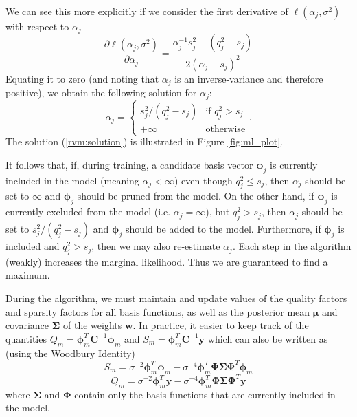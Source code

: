 We can see this more explicitly if we consider the first derivative of $\ell(\alpha_j,\sigma^2)$ with respect to $\alpha_j$ \cite{tipping2002}
\begin{equation*}
  \frac{\partial\ell(\alpha_j,\sigma^2)}{\partial\alpha_j} = \frac{\alpha_j^{-1}s_j^2 - (q_j^2 - s_j)}{2(\alpha_j+s_j)^2}
\end{equation*}
Equating it to zero (and noting that $\alpha_j$ is an inverse-variance and therefore positive), we obtain the following solution for $\alpha_j$:
\begin{equation}
  \label{rvm:solution}
  \alpha_j = \left\{\begin{array}{lr}
      s_j^2 / (q_j^2 - s_j) & \mbox{if $q_j^2 > s_j$}\\
      +\infty & \mbox{otherwise}
    \end{array}\right..
\end{equation}
The solution (\ref{rvm:solution}) is illustrated in Figure \ref{fig:ml_plot}.

It follows that, if, during training, a candidate basis vector $\bm\phi_j$ is currently included in the model (meaning $\alpha_j < \infty$) even though $q_j^2 \leq s_j$, then $\alpha_j$ should be set to $\infty$ and $\bm\phi_j$ should be pruned from the model.
On the other hand, if $\bm\phi_j$ is currently excluded from the model (i.e. $\alpha_j=\infty$), but $q_j^2 > s_j$, then $\alpha_j$ should be set to $s_j^2/(q_j^2-s_j)$ and $\bm\phi_j$ should be added to the model.
Furthermore, if $\bm\phi_j$ is included and $q_j^2 > s_j$, then we may also re-estimate $\alpha_j$.
Each step in the algorithm (weakly) increases the marginal likelihood. 
Thus we are guaranteed to find a maximum.

During the algorithm, we must maintain and update values of the quality factors and sparsity factors for all basis functions, as well as the posterior mean $\bm\mu$ and covariance $\bm\Sigma$ of the weights $\bm w$.
In practice, it easier to keep track of the quantities $Q_m = \bm\phi_m^T\bm C^{-1}\bm\phi_m$ and $S_m = \bm\phi_m^T\bm C^{-1}\bm y$ which can also be written as (using the Woodbury Identity)
\begin{equation}
  \label{rvm:S}
  S_m = \sigma^{-2}\bm\phi_m^T\bm\phi_m - \sigma^{-4}\bm\phi_m^T\bm\Phi\bm\Sigma\bm\Phi^T\bm\phi_m
\end{equation}
\begin{equation}
  \label{rvm:Q}
  Q_m = \sigma^{-2}\bm\phi_m^T\bm y - \sigma^{-4}\bm\phi_m^T\bm\Phi\bm\Sigma\bm\Phi^T\bm y
\end{equation}
where $\bm\Sigma$ and $\bm\Phi$ contain only the basis functions that are currently included in the model.
                                                 

